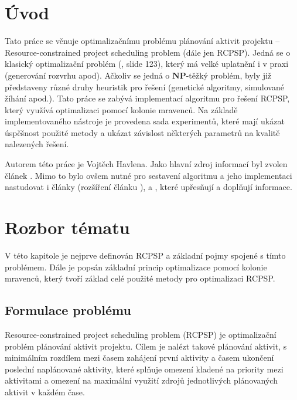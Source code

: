 \documentclass[a4paper,12pt]{article}
\begin{document}


\tableofcontents
\newpage

\section{Úvod}
Tato práce se věnuje optimalizačnímu problému plánování aktivit projektu -- Resource-constrained project scheduling 
problem (dále jen RCPSP). Jedná se o klasický optimalizační problém (\cite{peringer2}, slide 123), který má velké uplatnění i v praxi (generování rozvrhu apod). 
Ačkoliv se jedná o $\mathbf{NP}$-těžký problém, byly již představeny různé druhy heuristik 
pro řešení (genetické algoritmy, simulované žíhání apod.). 
Tato práce se zabývá implementací algoritmu pro řešení RCPSP, který využívá optimalizaci pomocí kolonie mravenců.
Na základě implementovaného nástroje je provedena sada experimentů, které mají ukázat úspěšnost použité metody
a ukázat závislost některých parametrů na kvalitě nalezených řešení.

Autorem této práce je Vojtěch Havlena. Jako hlavní zdroj informací byl zvolen článek \cite{Merkle00antcolony}.
Mimo to bylo ovšem nutné pro sestavení algoritmu a jeho implementaci nastudovat i články \cite{1027745} (rozšíření 
článku \cite{Merkle00antcolony}), \cite{Kolisch1999} a \cite{Blum2005353}, které 
upřesňují a doplňují informace.

\section{Rozbor tématu}
V této kapitole je nejprve definován RCPSP a základní pojmy spojené s tímto problémem. Dále je popsán
základní princip optimalizace pomocí kolonie mravenců, který tvoří základ celé použité metody
pro optimalizaci RCPSP.

\subsection{Formulace problému}
Resource-constrained project scheduling problem (RCPSP) je optimalizační problém plánování aktivit projektu.
Cílem je nalézt takové plánování aktivit, s minimálním rozdílem mezi časem zahájení první aktivity a časem ukončení 
poslední naplánované aktivity, které splňuje omezení kladené na priority mezi aktivitami a omezení na maximální 
využití zdrojů jednotlivých plánovaných aktivit v každém čase.
\end{document}
